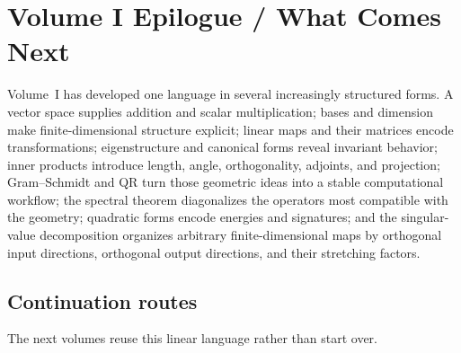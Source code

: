 \chapter*{Volume I Epilogue / What Comes Next}
\label{sec:i-volume-epilogue}

Volume~I has developed one language in several increasingly structured forms.
A vector space supplies addition and scalar multiplication; bases and dimension
make finite-dimensional structure explicit; linear maps and their matrices
encode transformations; eigenstructure and canonical forms reveal invariant
behavior; inner products introduce length, angle, orthogonality, adjoints, and
projection; Gram--Schmidt and QR turn those geometric ideas into a stable
computational workflow; the spectral theorem diagonalizes the operators most
compatible with the geometry; quadratic forms encode energies and signatures;
and the singular-value decomposition organizes arbitrary finite-dimensional
maps by orthogonal input directions, orthogonal output directions, and their
stretching factors.

\section*{Continuation routes}
The next volumes reuse this linear language rather than start over.

